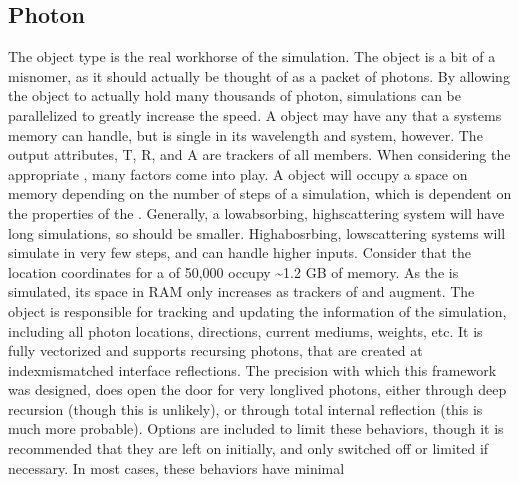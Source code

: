 \documentclass[letterpaper,10pt,english]{sphinxmanual}
\begin{document}
\subsection{Photon}
\label{\detokenize{README:photon}}
\sphinxAtStartPar
The  object type is the real work\sphinxhyphen{}horse of the simulation. The  object is a bit of a misnomer, as it
should actually be thought of as a packet of photons. By allowing the object to actually hold many thousands of photon,
simulations can be parallelized to greatly increase the speed. A  object may have any  that a
systems memory can handle, but is single in its wavelength and system, however. The output attributes, T, R, and A are
trackers of all  members. When considering the appropriate , many factors come into play. A
 object will occupy a space on memory depending on the number of steps of a simulation, which is dependent on
the properties of the . Generally, a low\sphinxhyphen{}absorbing, high\sphinxhyphen{}scattering system will have long simulations, so
 should be smaller. High\sphinxhyphen{}abosrbing, low\sphinxhyphen{}scattering systems will simulate in very few steps, and can handle
higher  inputs. Consider that the location coordinates for a  of 50,000 occupy \textasciitilde{}1.2 GB of
memory. As the  is simulated, its space in RAM only increases as trackers of  and  augment.
The  object is responsible for tracking and updating the information of the simulation, including all photon
locations, directions, current mediums, weights, etc. It is fully vectorized and supports recursing photons, that are
created at index\sphinxhyphen{}mismatched interface reflections. The precision with which this framework was designed, does open the
door for very long\sphinxhyphen{}lived photons, either through deep recursion (though this is unlikely), or through total internal
reflection (this is much more probable). Options are included to limit these behaviors, though it is recommended that
they are left on initially, and only switched off or limited if necessary. In most cases, these behaviors have minimal
\end{document}
